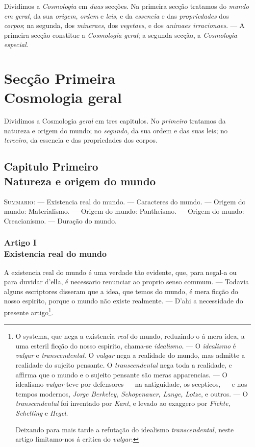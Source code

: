  Dividimos a \emph{Cosmologia} em \emph{duas} secções. Na
primeira secção tratamos do \emph{mundo em geral}, da sua \emph{origem}, \emph{ordem} e
\emph{leis}, e da \emph{essencia} e das \emph{propriedades} dos \emph{corpos}; na
segunda, dos \emph{mineraes}, dos \emph{vegetaes}, e dos \emph{animaes irracionaes}. ---
A primeira secção constitue a \emph{Cosmologia geral}; a segunda secção, a
\emph{Cosmologia especial}.

\part*{Secção Primeira\\ Cosmologia geral}

 Dividimos a Cosmologia \emph{geral} em tres
capitulos. No \emph{primeiro} tratamos da natureza e origem do mundo; no \emph{segundo},
da sua ordem e das suas leis; no \emph{terceiro}, da essencia e das propriedades dos
corpos.

\chapter*{Capitulo Primeiro\\[0.3em]\large Natureza e origem do mundo}

{\small\noindent\textsc{Summario}: --- Existencia real do mundo. --- Caracteres do mundo.
--- Origem do mundo: Materialismo. --- Origem do mundo: Pantheismo. --- Origem do mundo:
Creacianismo. --- Duração do mundo.\par}

\section*{Artigo I\\ Existencia real do mundo}

 A existencia real do mundo é uma verdade tão evidente, que,
para negal-a ou para duvidar d'ella, é necessario renunciar ao proprio senso commum. ---
Todavia alguns escriptores disseram que a idea, que temos do mundo, é mera ficção do
nosso espirito, porque o mundo não existe realmente. --- D'ahi a necessidade do presente
artigo\footnote{O systema, que nega a existencia \emph{real} do mundo, reduzindo-o á mera
idea, a uma esteril ficção do nosso espirito, chama-se \emph{idealismo}. --- O
\emph{idealismo} é \emph{vulgar} e \emph{transcendental}. O \emph{vulgar} nega a realidade
do mundo, mas admitte a realidade do sujeito pensante. O \emph{transcendental} nega toda a
realidade, e affirma que o mundo e o sujeito pensante são meras apparencias. --- O
idealismo \emph{vulgar} teve por defensores --- na antiguidade, os scepticos, --- e nos
tempos modernos, \emph{Jorge Berkeley, Schopenauer, Lange, Lotze}, e outros. --- O
\emph{transcendental} foi inventado por \emph{Kant}, e levado ao exaggero por
\emph{Fichte, Schelling} e \emph{Hegel}.

Deixando para mais tarde a refutação do idealismo \emph{transcendental}, neste artigo
limitamo-nos á critica do \emph{vulgar}.}.

